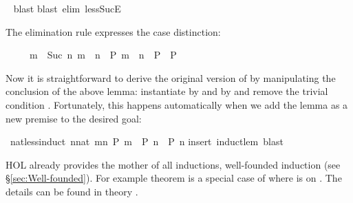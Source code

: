 \begin{isabellebody}
\isamarkuptrue%
\ \isamarkupfalse%
{\isacharparenleft}blast{\isacharparenright}\isanewline
{}\isamarkupfalse%
{\isacharparenleft}blast\ elim{\isacharcolon}\ less{\isacharunderscore}SucE{\isacharparenright}%
\endisatagproof
{\isafoldproof}%
%
\isadelimproof
%
\endisadelimproof
%
\begin{isamarkuptext}%
\noindent
The elimination rule  expresses the case distinction:
\begin{isabelle}%
\ \ \ \ \ {\isasymlbrakk}m\ {\isacharless}\ Suc\ n{\isacharsemicolon}\ m\ {\isacharless}\ n\ {\isasymLongrightarrow}\ P{\isacharsemicolon}\ m\ {\isacharequal}\ n\ {\isasymLongrightarrow}\ P{\isasymrbrakk}\ {\isasymLongrightarrow}\ P%
\end{isabelle}

Now it is straightforward to derive the original version of
 by manipulating the conclusion of the above
lemma: instantiate  by  and  by 
and remove the trivial condition . Fortunately, this
happens automatically when we add the lemma as a new premise to the
desired goal:%
\end{isamarkuptext}%
\isamarkuptrue%
\isamarkupfalse%
\ nat{\isacharunderscore}less{\isacharunderscore}induct{\isacharcolon}\ {\isachardoublequoteopen}{\isacharparenleft}{\isasymAnd}n{\isacharcolon}{\isacharcolon}nat{\isachardot}\ {\isasymforall}m{\isacharless}n{\isachardot}\ P\ m\ {\isasymLongrightarrow}\ P\ n{\isacharparenright}\ {\isasymLongrightarrow}\ P\ n{\isachardoublequoteclose}\isanewline
%
\isadelimproof
%
\endisadelimproof
%
\isatagproof
{}\isamarkupfalse%
{\isacharparenleft}insert\ induct{\isacharunderscore}lem{\isacharcomma}\ blast{\isacharparenright}%
\endisatagproof
{\isafoldproof}%
%
\isadelimproof
%
\endisadelimproof
%
\begin{isamarkuptext}%
HOL already provides the mother of
all inductions, well-founded induction (see \S\ref{sec:Well-founded}).  For
example theorem  is
a special case of  where  is \isa{{\isacharless}} on
. The details can be found in theory .%
\end{isamarkuptext}%
\isamarkuptrue%
%
\isadelimtheory
%
\endisadelimtheory
%
\isatagtheory
%
\endisatagtheory
{\isafoldtheory}%
%
\isadelimtheory
%
\endisadelimtheory
\end{isabellebody}%
